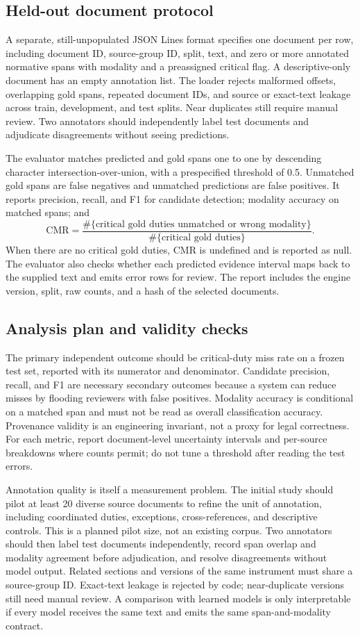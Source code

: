 \documentclass[11pt,a4paper]{article}
\begin{document}
\subsection{Held-out document protocol}
A separate, still-unpopulated JSON Lines format specifies one document per row, including document ID, source-group ID, split, text, and zero or more annotated normative spans with modality and a preassigned critical flag. A descriptive-only document has an empty annotation list. The loader rejects malformed offsets, overlapping gold spans, repeated document IDs, and source or exact-text leakage across train, development, and test splits. Near duplicates still require manual review. Two annotators should independently label test documents and adjudicate disagreements without seeing predictions.

The evaluator matches predicted and gold spans one to one by descending character intersection-over-union, with a prespecified threshold of 0.5. Unmatched gold spans are false negatives and unmatched predictions are false positives. It reports precision, recall, and F1 for candidate detection; modality accuracy on matched spans; and
\[
\mathrm{CMR}=\frac{\#\{\text{critical gold duties unmatched or wrong modality}\}}
{\#\{\text{critical gold duties}\}}.
\]
When there are no critical gold duties, CMR is undefined and is reported as null. The evaluator also checks whether each predicted evidence interval maps back to the supplied text and emits error rows for review. The report includes the engine version, split, raw counts, and a hash of the selected documents.

\subsection{Analysis plan and validity checks}
The primary independent outcome should be critical-duty miss rate on a frozen test set, reported with its numerator and denominator. Candidate precision, recall, and F1 are necessary secondary outcomes because a system can reduce misses by flooding reviewers with false positives. Modality accuracy is conditional on a matched span and must not be read as overall classification accuracy. Provenance validity is an engineering invariant, not a proxy for legal correctness. For each metric, report document-level uncertainty intervals and per-source breakdowns where counts permit; do not tune a threshold after reading the test errors.

Annotation quality is itself a measurement problem. The initial study should pilot at least 20 diverse source documents to refine the unit of annotation, including coordinated duties, exceptions, cross-references, and descriptive controls. This is a planned pilot size, not an existing corpus. Two annotators should then label test documents independently, record span overlap and modality agreement before adjudication, and resolve disagreements without model output. Related sections and versions of the same instrument must share a source-group ID. Exact-text leakage is rejected by code; near-duplicate versions still need manual review. A comparison with learned models is only interpretable if every model receives the same text and emits the same span-and-modality contract.
\end{document}
